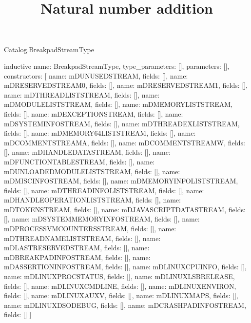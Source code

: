 \begin{lexlean}{Catalog.BreakpadStreamType}
\title{Natural number addition}
\begin{semanticmodule}
inductive{
  name: BreakpadStreamType,
  type_parameters: [],
  parameters: [],
  constructors: [
    {name: mDUNUSEDSTREAM, fields: []},
    {name: mDRESERVEDSTREAM0, fields: []},
    {name: mDRESERVEDSTREAM1, fields: []},
    {name: mDTHREADLISTSTREAM, fields: []},
    {name: mDMODULELISTSTREAM, fields: []},
    {name: mDMEMORYLISTSTREAM, fields: []},
    {name: mDEXCEPTIONSTREAM, fields: []},
    {name: mDSYSTEMINFOSTREAM, fields: []},
    {name: mDTHREADEXLISTSTREAM, fields: []},
    {name: mDMEMORY64LISTSTREAM, fields: []},
    {name: mDCOMMENTSTREAMA, fields: []},
    {name: mDCOMMENTSTREAMW, fields: []},
    {name: mDHANDLEDATASTREAM, fields: []},
    {name: mDFUNCTIONTABLESTREAM, fields: []},
    {name: mDUNLOADEDMODULELISTSTREAM, fields: []},
    {name: mDMISCINFOSTREAM, fields: []},
    {name: mDMEMORYINFOLISTSTREAM, fields: []},
    {name: mDTHREADINFOLISTSTREAM, fields: []},
    {name: mDHANDLEOPERATIONLISTSTREAM, fields: []},
    {name: mDTOKENSTREAM, fields: []},
    {name: mDJAVASCRIPTDATASTREAM, fields: []},
    {name: mDSYSTEMMEMORYINFOSTREAM, fields: []},
    {name: mDPROCESSVMCOUNTERSSTREAM, fields: []},
    {name: mDTHREADNAMELISTSTREAM, fields: []},
    {name: mDLASTRESERVEDSTREAM, fields: []},
    {name: mDBREAKPADINFOSTREAM, fields: []},
    {name: mDASSERTIONINFOSTREAM, fields: []},
    {name: mDLINUXCPUINFO, fields: []},
    {name: mDLINUXPROCSTATUS, fields: []},
    {name: mDLINUXLSBRELEASE, fields: []},
    {name: mDLINUXCMDLINE, fields: []},
    {name: mDLINUXENVIRON, fields: []},
    {name: mDLINUXAUXV, fields: []},
    {name: mDLINUXMAPS, fields: []},
    {name: mDLINUXDSODEBUG, fields: []},
    {name: mDCRASHPADINFOSTREAM, fields: []}
  ]
}
\end{semanticmodule}
\end{lexlean}
